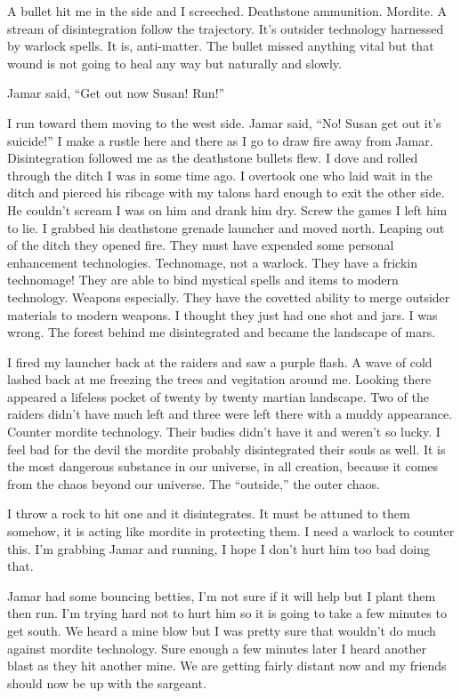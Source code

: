 A bullet hit me in the side and I screeched. Deathstone ammunition. Mordite. A stream of disintegration follow the trajectory. It's outsider technology harnessed by warlock spells. It is, anti-matter. The bullet missed anything vital but that wound is not going to heal any way but naturally and slowly.

Jamar said, ``Get out now Susan! Run!''

I run toward them moving to the west side. Jamar said, ``No! Susan get out it's suicide!'' I make a rustle here and there as I go to draw fire away from Jamar. Disintegration followed me as the deathstone bullets flew. I dove and rolled through the ditch I was in some time ago. I overtook one who laid wait in the ditch and pierced his ribcage with my talons hard enough to exit the other side. He couldn't scream I was on him and drank him dry. Screw the games I left him to lie. I grabbed his deathstone grenade launcher and moved north. Leaping out of the ditch they opened fire. They must have expended some personal enhancement technologies. Technomage, not a warlock. They have a frickin technomage! They are able to bind mystical spells and items to modern technology. Weapons especially. They have the covetted ability to merge outsider materials to modern weapons. I thought they just had one shot and jars. I was wrong. The forest behind me disintegrated and became the landscape of mars.

I fired my launcher back at the raiders and saw a purple flash. A wave of cold lashed back at me freezing the trees and vegitation around me. Looking there appeared a lifeless pocket of twenty by twenty martian landscape. Two of the raiders didn't have much left and three were left there with a muddy appearance. Counter mordite technology. Their budies didn't have it and weren't so lucky. I feel bad for the devil the mordite probably disintegrated their souls as well. It is the most dangerous substance in our universe, in all creation, because it comes from the chaos beyond our universe. The ``outside,'' the outer chaos.

I throw a rock to hit one and it disintegrates. It must be attuned to them somehow, it is acting like mordite in protecting them. I need a warlock to counter this. I'm grabbing Jamar and running, I hope I don't hurt him too bad doing that.

Jamar had some bouncing betties, I'm not sure if it will help but I plant them then run. I'm trying hard not to hurt him so it is going to take a few minutes to get south. We heard a mine blow but I was pretty sure that wouldn't do much against mordite technology. Sure enough a few minutes later I heard another blast as they hit another mine. We are getting fairly distant now and my friends should now be up with the sargeant. 

